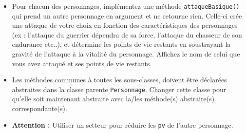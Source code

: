 \begin{Exercice}[15 minutes]
\begin{itemize}
    

    \item Pour chacun des personnages, implémentez une méthode \lstinline{attaqueBasique()} qui prend un autre personnage en argument et ne retourne rien. Celle-ci crée une attaque de votre choix en fonction des caractéristiques des personnages (ex : l’attaque du guerrier dépendra de sa force, l’attaque du chasseur de son endurance etc..), et détermine les points de vie restants en soustrayant la gravité de l'attaque à la vitalité du personnage. Affichez le nom de celui que vous avez attaqué et ses points de vie restants.
    \item Les méthodes communes à toutes les sous-classes, doivent être déclarées abstraites dans la classe parente \lstinline{Personnage}. Changer cette classe pour qu'elle soit maintenant abstraite avec la/les méthode(s) abstraite(s) correspondante(s).
    \item \textbf{Attention :} Utiliser un setteur pour réduire les \lstinline{pv} de l’autre personnage.
    
    
\end{itemize}

\begin{solution}
    
\end{solution}
\begin{solution}
    
\end{solution}

\begin{solution}
    
\end{solution}
\begin{solution}
    
\end{solution}
\end{Exercice}

